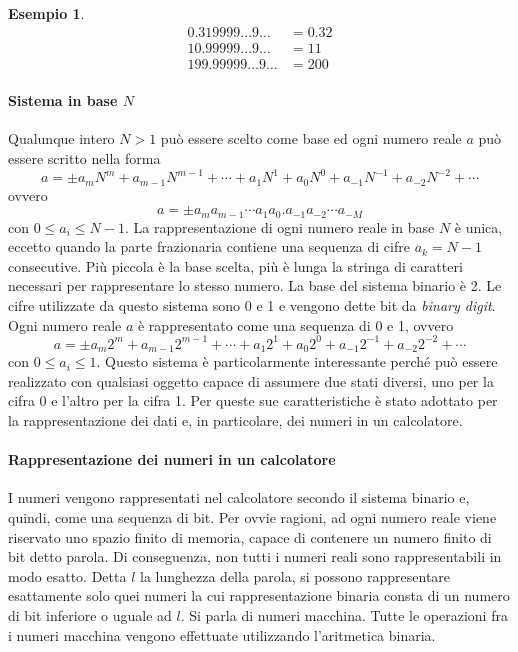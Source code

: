 \documentclass{article}
\theoremstyle{plain}
\theoremstyle{definition}
\newtheorem{exmp}{Esempio}[section]
\theoremstyle{remark}
\begin{document}
\begin{exmp}
\[
\begin{aligned}
    0.319999\ldots 9\ldots & = 0.32 \\
    10.99999\ldots 9\ldots & = 11 \\
    199.99999\ldots 9\ldots & = 200
\end{aligned}
\]
\end{exmp}

\paragraph{Sistema in base $N$}
Qualunque intero \(N > 1\) può essere scelto come base ed ogni numero reale \(a\) può essere scritto nella forma
\[ a = \pm a_m N^m + a_{m-1} N^{m-1} + \cdots + a_1 N^1 + a_0 N^0 + a_{-1} N^{-1} + a_{-2} N^{-2} + \cdots \]
ovvero
\[ a = \pm a_m a_{m-1} \cdots a_1 a_0.a_{-1} a_{-2} \cdots a_{-M} \]
con \(0 \leq a_i \leq N - 1\).
La rappresentazione di ogni numero reale in base \(N\) è unica, eccetto quando la parte frazionaria contiene una sequenza di cifre \(a_k = N - 1\) consecutive.
Più piccola è la base scelta, più è lunga la stringa di caratteri necessari per rappresentare lo stesso numero.
La base del sistema binario è 2.
Le cifre utilizzate da questo sistema sono 0 e 1 e vengono dette bit da \textit{binary digit}.
Ogni numero reale \(a\) è rappresentato come una sequenza di 0 e 1, ovvero
\[ a = \pm a_m 2^m + a_{m-1} 2^{m-1} + \cdots + a_1 2^1 + a_0 2^0 + a_{-1} 2^{-1} + a_{-2} 2^{-2} + \cdots \]
con \(0 \leq a_i \leq 1\).
Questo sistema è particolarmente interessante perché può essere realizzato con qualsiasi oggetto capace di assumere due stati diversi, uno per la cifra 0 e l'altro per la cifra 1.
Per queste sue caratteristiche è stato adottato per la rappresentazione dei dati e, in particolare, dei numeri in un calcolatore.

\paragraph{Rappresentazione dei numeri in un calcolatore}
I numeri vengono rappresentati nel calcolatore secondo il sistema binario e, quindi, come una sequenza di bit.
Per ovvie ragioni, ad ogni numero reale viene riservato uno spazio finito di memoria, capace di contenere un numero finito di bit detto parola.
Di conseguenza, non tutti i numeri reali sono rappresentabili in modo esatto.
Detta \(l\) la lunghezza della parola, si possono rappresentare esattamente solo quei numeri la cui rappresentazione binaria consta di un numero di bit inferiore o uguale ad \(l\).
Si parla di numeri macchina.
Tutte le operazioni fra i numeri macchina vengono effettuate utilizzando l'aritmetica binaria.
\end{document}
